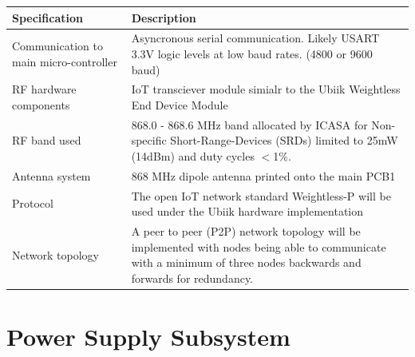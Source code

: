\documentclass[12pt]{article}
\begin{document}
\begin{center}
  \begin{table}[!htb]
    
    \hskip-2.2cm\begin{tabular}{|p{8cm}|p{10cm}|}
        \hline
        \textbf{Specification} & \textbf{Description} \\
        \hline
        Communication to main micro-controller & Asyncronous serial communication. Likely USART 3.3V logic levels at low
        baud rates. (4800 or 9600 baud) \\[0.3cm]
        
        RF hardware components & IoT transciever module simialr to the Ubiik Weightless End Device Module \\[0.3cm]
        RF band used & 868.0 - 868.6 MHz band allocated by ICASA for Non-specific Short-Range-Devices (SRDs) limited to 
        25mW (14dBm) and duty cycles $<$1\%. \\[0.3cm]
        Antenna system & 868 MHz dipole antenna printed onto the main PCB1 \\[0.3cm]
        Protocol & The open IoT network standard Weightless-P will be used under the Ubiik hardware
        implementation \\[0.3cm]
        Network topology & A peer to peer (P2P) network topology will be implemented with nodes being able to communicate
        with a minimum of three nodes backwards and forwards for redundancy.\\[0.3cm]

        \hline

    \end{tabular}    
    
    \label{tab:summary_measurments}
   \end{table}
\end{center}


\section{Power Supply Subsystem}
\end{document}
